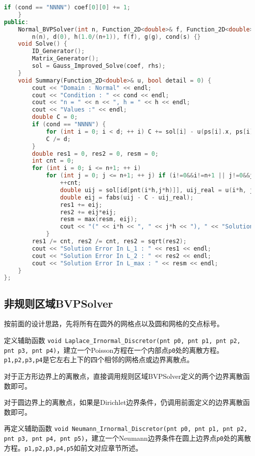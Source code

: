 \documentclass{ctexart}
\begin{document}
\begin{lstlisting}[language={c++}]
        if (cond == "NNNN") coef[0][0] += 1;
    }
public:
    Normal_BVPSolver(int n, Function_2D<double>& f, Function_2D<double>& g, const string& s) :
        n(n), d(0), h(1.0/(n+1)), f(f), g(g), cond(s) {}
    void Solve() {
        ID_Generator();
        Matrix_Generator();
        sol = Gauss_Improved_Solve(coef, rhs);
    }
    void Summary(Function_2D<double>& u, bool detail = 0) {
        cout << "Domain : Normal" << endl;
        cout << "Condition : " << cond << endl;
        cout << "n = " << n << ", h = " << h << endl;
        cout << "Values :" << endl;
        double C = 0;
        if (cond == "NNNN") {
            for (int i = 0; i < d; ++ i) C += sol[i] - u(ps[i].x, ps[i].y);
            C /= d;
        }
        double res1 = 0, res2 = 0, resm = 0;
        int cnt = 0;
        for (int i = 0; i <= n+1; ++ i)
            for (int j = 0; j <= n+1; ++ j) if (i!=0&&i!=n+1 || j!=0&&j!=n+1) {
                ++cnt;
                double uij = sol[id[pnt(i*h,j*h)]], uij_real = u(i*h, j*h);
                double eij = fabs(uij - C - uij_real);
                res1 += eij;
                res2 += eij*eij;
                resm = max(resm, eij);
                cout << "(" << i*h << ", " << j*h << "), " << "Solution Value : " << uij << ", Real Value : " << uij_real << endl;
            }
        res1 /= cnt, res2 /= cnt, res2 = sqrt(res2);
        cout << "Solution Error In L_1 : " << res1 << endl;
        cout << "Solution Error In L_2 : " << res2 << endl;
        cout << "Solution Error In L_max : " << resm << endl;
    }
};
\end{lstlisting}

\subsection{非规则区域BVPSolver}

按前面的设计思路，先将所有在圆外的网格点以及圆和网格的交点标号。

定义辅助函数 \verb|void Laplace_Irnormal_Discretor(pnt p0, pnt p1, pnt p2, pnt p3, pnt p4)|，建立一个Poisson方程在一个内部点\verb|p0|处的离散方程。\verb|p1,p2,p3,p4|是它左右上下的四个相邻的网格点或边界离散点。

对于正方形边界上的离散点，直接调用规则区域BVPSolver定义的两个边界离散函数即可。

对于圆边界上的离散点，如果是Dirichlet边界条件，仍调用前面定义的边界离散函数即可。

再定义辅助函数 \verb|void Neumann_Irnormal_Discretor(pnt p0, pnt p1, pnt p2, pnt p3, pnt p4, pnt p5)|，建立一个Neumann边界条件在圆上边界点\verb|p0|处的离散方程。\verb|p1,p2,p3,p4,p5|如前文对应章节所述。
\end{document}
